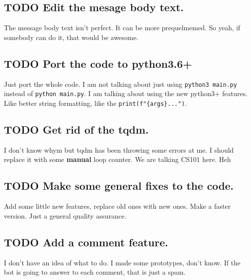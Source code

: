 \documentclass[11pt]{article}
\begin{document}
\subsection{{\bfseries\sffamily TODO} Edit the mesage body text.}
\label{sec-8-1}

The message body text isn't perfect. It can be more prequelmemed. So yeah, if
somebody can do it, that would be awesome.

\subsection{{\bfseries\sffamily TODO} Port the code to python3.6+}
\label{sec-8-2}

Just port the whole code. I am not talking about just using \verb~python3 main.py~
instead of \verb~python main.py~. I am talking about using the new python3+
features. Like better string formatting, like the \verb~print(f"{args}...")~.

\subsection{{\bfseries\sffamily TODO} Get rid of the tqdm.}
\label{sec-8-3}

I don't know whym but tqdm has been throwing some errors at me. I should replace
it with some \textbf{manual} loop counter. We are talking CS101 here. Heh

\subsection{{\bfseries\sffamily TODO} Make some general fixes to the code.}
\label{sec-8-4}

Add some little new features, replace old ones with new ones. Make a faster
version. Just a general quality assurance.

\subsection{{\bfseries\sffamily TODO} Add a comment feature.}
\label{sec-8-5}

I don't have an idea of what to do. I made some prototypes, don't know. If the
bot is going to answer to each comment, that is just a spam.
\end{document}

